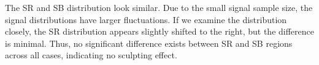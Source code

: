 \documentclass[12pt]{article}
\begin{document}
        The SR and SB distribution look similar. Due to the small signal sample size, the signal distributions have larger fluctuations. If we examine the distribution closely, the SR distribution appears slightly shifted to the right, but the difference is minimal. Thus, no significant difference exists between SR and SB regions across all cases, indicating no sculpting effect.
        \begin{figure}[htpb]
            \centering
             \\
\end{figure}
\end{document}
